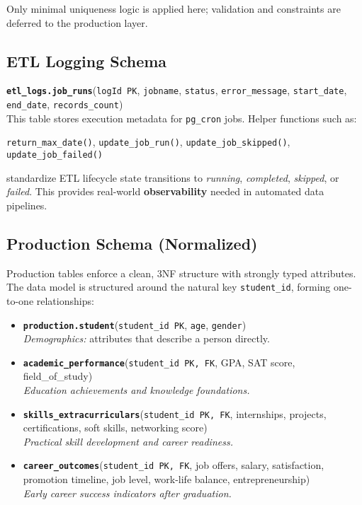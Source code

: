 \documentclass[11pt]{article}
\begin{document}
Only minimal uniqueness logic is applied here; validation and constraints are deferred to the production layer.

\vspace{6pt}
\subsection*{ETL Logging Schema}

\textbf{\texttt{etl\_logs.job\_runs}}(\texttt{logId PK}, \texttt{jobname}, \texttt{status}, \texttt{error\_message}, \texttt{start\_date}, \texttt{end\_date}, \texttt{records\_count})\\[3pt]
This table stores execution metadata for \texttt{pg\_cron} jobs. Helper functions such as:
\begin{center}
\texttt{return\_max\_date()}, \texttt{update\_job\_run()}, \texttt{update\_job\_skipped()}, \texttt{update\_job\_failed()}
\end{center}
standardize ETL lifecycle state transitions to \emph{running}, \emph{completed}, \emph{skipped}, or \emph{failed}.  
This provides real-world \textbf{observability} needed in automated data pipelines.

\vspace{6pt}
\subsection*{Production Schema (Normalized)}

Production tables enforce a clean, 3NF structure with strongly typed attributes. The data model is structured around the natural key \texttt{student\_id}, forming one-to-one relationships:

\begin{itemize}[leftmargin=1.4em]
  \item \textbf{\texttt{production.student}}(\texttt{student\_id PK}, \texttt{age}, \texttt{gender})\\
  \textit{Demographics:} attributes that describe a person directly.

  \item \textbf{\texttt{academic\_performance}}(\texttt{student\_id PK, FK}, GPA, SAT score, field\_of\_study)\\
  \textit{Education achievements and knowledge foundations.}

  \item \textbf{\texttt{skills\_extracurriculars}}(\texttt{student\_id PK, FK}, internships, projects, certifications, soft skills, networking score)\\
  \textit{Practical skill development and career readiness.}

  \item \textbf{\texttt{career\_outcomes}}(\texttt{student\_id PK, FK}, job offers, salary, satisfaction, promotion timeline, job level, work-life balance, entrepreneurship)\\
  \textit{Early career success indicators after graduation.}
\end{itemize}
\end{document}
